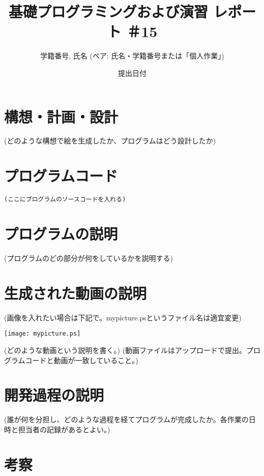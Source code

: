 \documentclass[12pt,a4j]{jarticle}
\begin{document}
\title{基礎プログラミングおよび演習 レポート ＃15}
\author{学籍番号, 氏名 (ペア: 氏名・学籍番号または「個人作業」)}
\date{提出日付}
\maketitle

\section{構想・計画・設計}

(どのような構想で絵を生成したか、プログラムはどう設計したか)

\section{プログラムコード}

\begin{verbatim}
(ここにプログラムのソースコードを入れる)
\end{verbatim}

\section{プログラムの説明}

(プログラムのどの部分が何をしているかを説明する)

\section{生成された動画の説明}

(画像を入れたい場合は下記で。mypicture.psというファイル名は適宜変更)
\begin{center}
\texttt{[image: mypicture.ps]}
\end{center}

(どのような動画という説明を書く。)
(動画ファイルはアップロードで提出。プログラムコードと動画が一致していること。)

\section{開発過程の説明}

(誰が何を分担し、どのような過程を経てプログラムが完成したか。各作業の日時と担当者の記録があるとよい。)

\section{考察}
\end{document}
